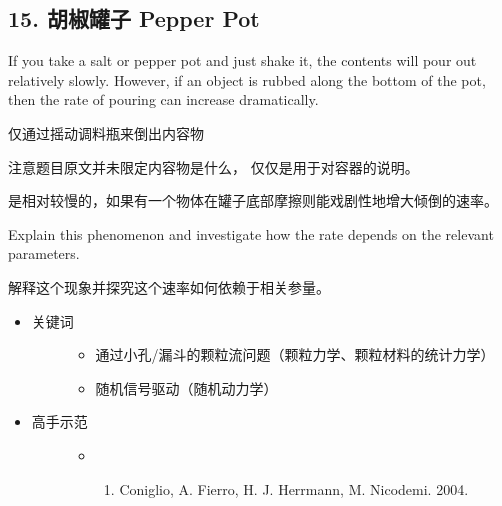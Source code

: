 \documentclass[a4paper,10pt,english]{sphinxmanual}
\begin{document}
\subsection{15. 胡椒罐子 Pepper Pot}
\label{\detokenize{7. Appendix:pepper-pot}}
If you take a salt or pepper pot and just shake it, the contents will pour out relatively slowly. However, if an object is rubbed along the bottom of the pot, then the rate of pouring can increase dramatically.

仅通过摇动调料瓶来倒出内容物 %
\begin{footnote}[11]\sphinxAtStartFootnote
注意题目原文并未限定内容物是什么，  仅仅是用于对容器的说明。
%
\end{footnote} 是相对较慢的，如果有一个物体在罐子底部摩擦则能戏剧性地增大倾倒的速率。

Explain this phenomenon and investigate how the rate depends on the relevant parameters.

解释这个现象并探究这个速率如何依赖于相关参量。
\begin{itemize}
\item {} \begin{description}
\item[{关键词}] \leavevmode\begin{itemize}
\item {} 
通过小孔/漏斗的颗粒流问题（颗粒力学、颗粒材料的统计力学）

\item {} 
随机信号驱动（随机动力学）

\end{itemize}

\end{description}

\item {} \begin{description}
\item[{高手示范}] \leavevmode\begin{itemize}
\item {} \begin{enumerate}
\item {} 
Coniglio, A. Fierro, H. J. Herrmann, M. Nicodemi.  2004.

\end{enumerate}

\end{itemize}

\end{description}

\end{itemize}
\end{document}
